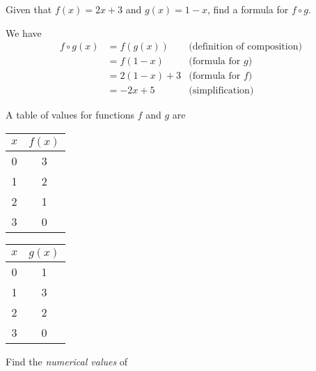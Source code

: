 \documentclass[12pt,fleqn,answers]{exam}
\begin{document}
\begin{questions}
\begin{parts}
\end{parts}


\question [2] Given that $f(x) = 2 x + 3$ and $g(x) = 1-x$, find 
a formula for $f \circ g$.

\begin{solution} We have
  \begin{align*}
     f \circ g (x) &= f(g(x)) & \mbox{(definition of composition)} \\
                   &= f(1-x)   & \mbox{(formula for $g$)} \\
                   &= 2 (1-x) + 3 & \mbox{(formula for $f$)} \\
                   &= -2x + 5 & \mbox{(simplification)} 
  \end{align*}

\end{solution}

\question A table of values for functions $f$ and $g$ are

\begin{tabular}[h]{|c|c|} 
  \hline
  $x$  & $f(x)$ \\ \hline \hline
  0    & 3 \\ \hline
  1    & 2 \\ \hline
  2    & 1 \\ \hline
  3    & 0 \\ \hline
\end{tabular} \phantom{xxxxxxx}
\begin{tabular}[h]{|c|c|} 
  \hline
  $x$  & $g(x)$ \\ \hline \hline
  0    & 1 \\ \hline
  1    & 3 \\ \hline
  2    & 2 \\ \hline
  3    & 0 \\ \hline
\end{tabular} 

Find the \emph{numerical values} of 
\end{questions}
\end{document}
